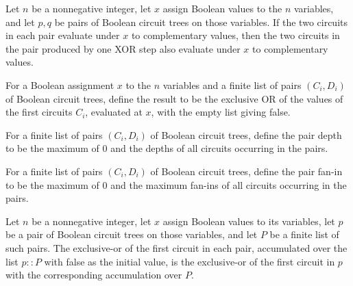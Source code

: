 \begin{theorem}
\label{BoolCircuit.xorNode_isDual}
\leanok
{}
Let $n$ be a nonnegative integer, let $x$ assign Boolean values to the $n$ variables,
and let $p,q$ be pairs of Boolean circuit trees on those variables. If the two circuits
in each pair evaluate under $x$ to complementary values, then the two circuits in the
pair produced by one XOR step also evaluate under $x$ to complementary values.
\end{theorem}

\begin{definition}
\label{BoolCircuit.xorAll}
\leanok
{}
For a Boolean assignment $x$ to the $n$ variables and a finite list of pairs $(C_i,D_i)$
of Boolean circuit trees, define the result to be the exclusive OR of the values of the
first circuits $C_i$, evaluated at $x$, with the empty list giving false.
\end{definition}

\begin{definition}
\label{BoolCircuit.pairDepth}
\leanok
{}
For a finite list of pairs $(C_i,D_i)$ of Boolean circuit trees, define the pair depth
to be the maximum of $0$ and the depths of all circuits occurring in the pairs.
\end{definition}

\begin{definition}
\label{BoolCircuit.pairFanin}
\leanok
{}
For a finite list of pairs $(C_i,D_i)$ of Boolean circuit trees, define the pair fan-in
to be the maximum of $0$ and the maximum fan-ins of all circuits occurring in the pairs.
\end{definition}

\begin{theorem}
\label{BoolCircuit.xorAll_cons}
\leanok
{}
Let $n$ be a nonnegative integer, let $x$ assign Boolean values to its variables, let
$p$ be a pair of Boolean circuit trees on those variables, and let $P$ be a finite list
of such pairs. The exclusive-or of the first circuit in each pair, accumulated over the
list $p::P$ with false as the initial value, is the exclusive-or of the first circuit in
$p$ with the corresponding accumulation over $P$.
\end{theorem}


